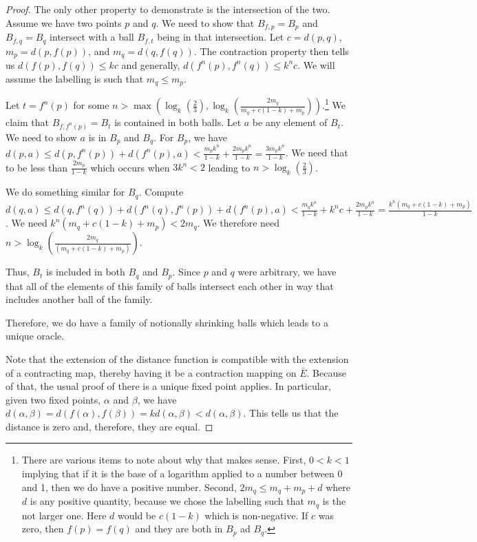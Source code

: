 \documentclass[12pt]{article}
\begin{document}
\begin{proof}
    The only other property to demonstrate is the intersection of the two.  Assume we have two points $p$ and $q$. We need to show that $B_{f, p} = B_p$ and $B_{f, q}= B_q$ intersect with a ball $B_{f, t}$ being in that intersection. Let $c = d(p,q)$, $m_p = d(p, f(p))$, and $m_q = d(q, f(q))$. The contraction property then tells us $d(f(p), f(q)) \leq kc$ and generally, $d(f^n(p), f^n(q)) \leq k^n c$. We will assume the labelling is such that $m_q \leq m_p$. 

    Let $t = f^n(p)$ for some $n >  \max( \log_k( \frac{2}{3}), \log_k (\frac{2m_q}{m_q +c(1-k) + m_p} ) )$.\footnote{There are various items to note about why that makes sense. First, $0  < k <1$ implying that if it is the base of a logarithm applied to a number between 0 and 1, then we do have a positive number. Second, $2m_q \leq m_q + m_p + d$ where $d$ is any positive quantity, because we chose the labelling such that $m_q$ is the not larger one. Here $d$ would be $c(1-k)$ which is non-negative. If $c$ was zero, then $f(p) = f(q)$ and they are both in $B_p$ ad $B_q$.} We claim that $B_{f, f^n(p)} = B_t$ is contained in both balls. Let $a$ be any element of $B_t$. We need to show $a$ is in $B_p$ and $B_q$. For $B_p$, we have $d(p, a) \leq d(p, f^n(p)) + d(f^n(p), a) < \frac{m_p k^n}{1-k} + \frac{2m_p k^n}{1-k} = \frac{3m_p k^n}{1-k}$.  We need that to be less than $\frac{2 m_p}{1-k}$ which occurs when $3 k^n < 2$ leading to $n > \log_k (\frac{2}{3}) $. 

    We do something similar for $B_q$. Compute $d(q,a) \leq d(q, f^n(q)) + d(f^n(q), f^n(p)) + d(f^n(p), a) < \frac{m_q k^n}{1-k} + k^n c + \frac{2m_p k^n}{1-k} = \frac{ k^n (m_q + c(1 - k) + m_p)}{1-k}$. We need $k^n (m_q + c(1-k) + m_p) < 2 m_q $. We therefore need $n > \log_k (\frac{2 m_q}{(m_q + c(1-k) + m_p)})$.

    Thus, $B_t$ is included in both $B_q$ and $B_p$. Since $p$ and $q$ were arbitrary, we have that all of the elements of this family of balls intersect each other in way that includes another ball of the family. 

    Therefore, we do have a family of notionally shrinking balls which leads to a unique oracle. 

    Note that the extension of the distance function is compatible with the extension of a contracting map, thereby having it be a contraction mapping on $\bar{E}$. Because of that, the usual proof of there is a unique fixed point applies. In particular, given two fixed points, $\alpha$ and $\beta$, we have $d(\alpha, \beta) = d(f (\alpha), f(\beta)) = k d(\alpha, \beta) < d(\alpha, \beta)$. This tells us that the distance is zero and, therefore, they are equal. 
    
\end{proof}
\end{document}
